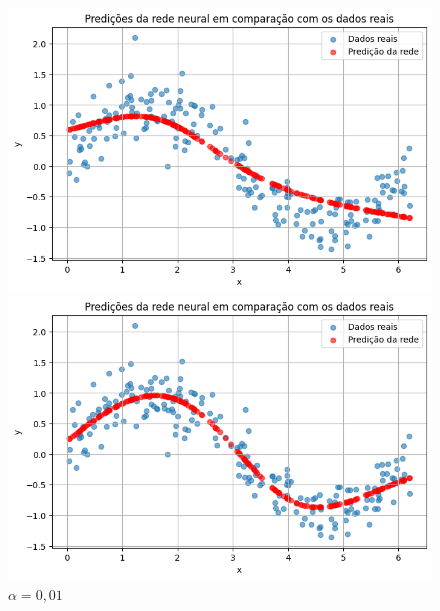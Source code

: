 \begin{figure}[htb]
	\centering
	\begin{minipage}{0.45\textwidth}
		\centering
		\caption{$\alpha = 0,001$}\label{tarefa03:0001:predicoes}
		
\includegraphics[width=\textwidth]{./0803_imgs/png-241110-175032242-2586281422306343440.png}
	\end{minipage}
	\hfill
	\begin{minipage}{0.45\textwidth}
		\centering
		\caption{$\alpha = 0,01$}\label{tarefa03:001:predicoes}
		\includegraphics[width=\textwidth]{./0803_imgs/png-241110-175254024-1064294634935646228.png}
	\end{minipage}
\end{figure}